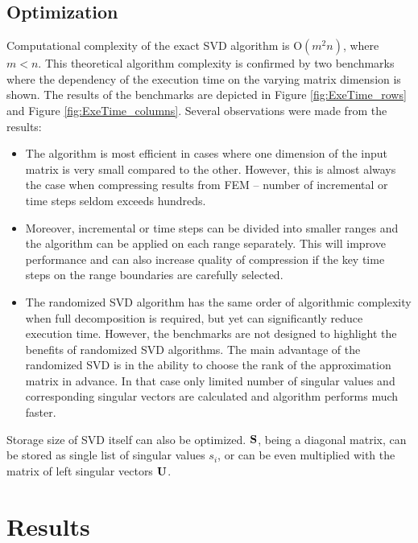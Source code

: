 \subsection{Optimization}

Computational complexity of the exact SVD algorithm is $\mathrm{O}(m^2n)$, where $m<n$. This theoretical algorithm complexity is confirmed by two benchmarks where the dependency of the execution time on the varying matrix dimension is shown. The results of the benchmarks are depicted in Figure \ref{fig:ExeTime_rows} and Figure \ref{fig:ExeTime_columns}. Several observations were made from the results:

\begin{itemize}
\item The algorithm is most efficient in cases where one dimension of the input matrix is very small compared to the other. However, this is almost always the case when compressing results from FEM -- number of incremental or time steps seldom exceeds hundreds.
\item Moreover, incremental or time steps can be divided into smaller ranges and the algorithm can be applied on each range separately. This will improve performance and can also increase quality of compression if the key time steps on the range boundaries are carefully selected.
\item The randomized SVD algorithm has the same order of algorithmic complexity when full decomposition is required, but yet can significantly reduce execution time. However, the benchmarks are not designed to highlight the benefits of randomized SVD algorithms. The main advantage of the randomized SVD is in the ability to choose the rank of the approximation matrix in advance. In that case only limited number of singular values and corresponding singular vectors are calculated and algorithm performs much faster.
\end{itemize}

Storage size of SVD itself can also be optimized. $\mathbf{S}$, being a diagonal matrix, can be stored as single list of singular values $s_{i}$, or can be even multiplied with the matrix of left singular vectors $\mathbf{U}$.



\section{Results}

